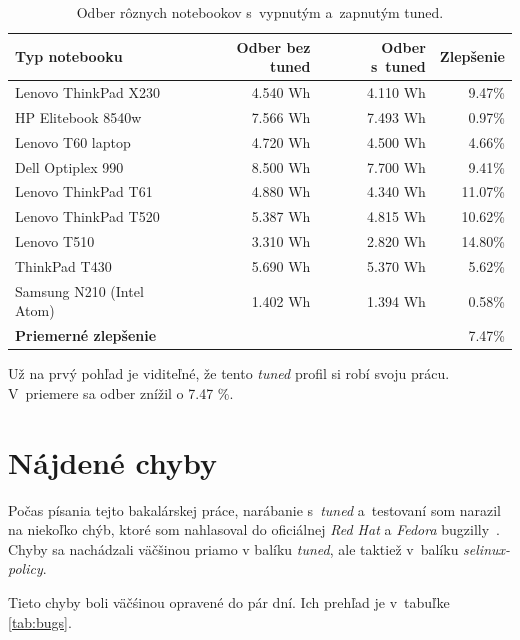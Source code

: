 \begin{table}[H]
\begin{center}
\begin{tabular}{|l|r|r|r|}
    \hline
    \textbf{Typ notebooku} & \textbf{Odber bez tuned} & \textbf{Odber s~tuned} & \textbf{Zlepšenie} \\
    \hline
    Lenovo ThinkPad X230        & 4.540 Wh & 4.110 Wh & 9.47\% \\
    HP Elitebook 8540w          & 7.566 Wh & 7.493 Wh & 0.97\% \\
    Lenovo T60 laptop           & 4.720 Wh & 4.500 Wh & 4.66\% \\
    Dell Optiplex 990           & 8.500 Wh & 7.700 Wh & 9.41\% \\
    Lenovo ThinkPad T61         & 4.880 Wh & 4.340 Wh & 11.07\% \\
    Lenovo ThinkPad T520        & 5.387 Wh & 4.815 Wh & 10.62\% \\
    Lenovo T510                 & 3.310 Wh & 2.820 Wh & 14.80\% \\
    ThinkPad T430               & 5.690 Wh & 5.370 Wh & 5.62\% \\
    Samsung N210 (Intel Atom)   & 1.402 Wh & 1.394 Wh & 0.58\% \\
    \hline
    \textbf{Priemerné zlepšenie} & \multicolumn{3}{|r|}{7.47\%} \\
    \hline
\end{tabular}
\caption{Odber rôznych notebookov s~vypnutým a~zapnutým tuned.}
\label{tab:testday-results}
\end{center}
\end{table}

Už na prvý pohľad je viditeľné, že tento \emph{tuned} profil si robí svoju
prácu. V~priemere sa odber znížil o 7.47 \%. 

%
%

\section{Nájdené chyby}

Počas písania tejto bakalárskej práce, narábanie s~\emph{tuned} a~testovaní som
narazil na niekoľko chýb, ktoré som nahlasoval do oficiálnej \emph{Red Hat} a
\emph{Fedora} bugzilly~\cite{rhBugzilla}. Chyby sa nachádzali väčšinou priamo v
balíku \emph{tuned}, ale taktiež v~balíku \emph{selinux-policy}.

Tieto chyby boli väčśinou opravené do pár dní. Ich prehľad je v~tabuľke \ref{tab:bugs}.

